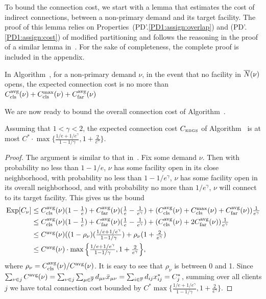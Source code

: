 
To bound the connection cost, we start with a lemma
that estimates the cost of indirect connections, between a non-primary demand and its
target facility. The proof of this lemma relies on
Properties~(PD'.\ref{PD1:assign:overlap}) and (PD'.\ref{PD1:assign:cost}) of 
modified partitioning and follows the reasoning in the proof of a similar 
lemma in~\cite{ByrkaGS10,ByrkaA10}.
For the sake of completeness, the complete proof is included in the appendix.

\begin{lemma}\label{lem: EBGS target connection cost}
In Algorithm~{\EBGS}, for a non-primary demand $\nu$, in the event that
no facility in ${\overline{N}}(\nu)$ opens, the expected connection cost is
  no more than $C_{\text{cls}}^{{\mbox{\scriptsize\rm avg}}}(\nu)+C_{\text{cls}}^{\max}(\nu)+C_{\text{far}}^{{\mbox{\scriptsize\rm avg}}}(\nu)$
\end{lemma}

We are now ready to bound the overall connection cost of Algorithm~{\EBGS}.

\begin{lemma}\label{lem: EBGS connection cost}
  Assuming that $1 < \gamma < 2$, the expected connection
  cost $C_{\mbox{\tiny\rm EBGS}}$ of Algorithm~{\EBGS} is at most
  $C^\ast\cdot\max\{\frac{1/e+1/e^\gamma}{1-1/\gamma},
  1+\frac{2}{e^\gamma}\}$.
\end{lemma}

\begin{proof}
The argument is similar to that in~\cite{ByrkaGS10}. Fix some
demand $\nu$. Then with
  probability no less than $1-1/e$, $\nu$ has some facility open in
  its close neighborhood, with probability no less than
  $1-1/e^\gamma$, $\nu$ has some facility open in its overall
  neighborhood, and with probability no more than $1/e^\gamma$, $\nu$
  will connect to its target facility.  This gives us the bound
%
\begin{align*}
  \mbox{\rm Exp}[C_{\nu}] &\leq 
	\textstyle 
	C_{\text{cls}}^{{\mbox{\scriptsize\rm avg}}}(\nu)(1-\frac{1}{e}) + C_{\text{far}}^{{\mbox{\scriptsize\rm avg}}}(\nu)(\frac{1}{e}-\frac{1}{e^\gamma}) 
					+ (C_{\text{cls}}^{{\mbox{\scriptsize\rm avg}}}(\nu)+C_{\text{cls}}^{\max}(\nu)+C_{\text{far}}^{{\mbox{\scriptsize\rm avg}}}(\nu))\frac{1}{e^\gamma}
\\
  &\leq 
	\textstyle
	C_{\text{cls}}^{{\mbox{\scriptsize\rm avg}}}(\nu)(1-\frac{1}{e}) + C_{\text{far}}^{{\mbox{\scriptsize\rm avg}}}(\nu)(\frac{1}{e}-\frac{1}{e^\gamma})
	 			+ (C_{\text{cls}}^{{\mbox{\scriptsize\rm avg}}}(\nu)+2C_{\text{far}}^{{\mbox{\scriptsize\rm avg}}}(\nu))\frac{1}{e^\gamma}
\\
  &\leq
	\textstyle
  C^{{\mbox{\scriptsize\rm avg}}}(\nu)((1-\rho_{\nu})(\frac{1/e+1/e^\gamma}{1-1/\gamma})
  + \rho_{\nu}(1+\frac{2}{e^\gamma}) 
\\
  &\leq 
	\textstyle
	C^{{\mbox{\scriptsize\rm avg}}}(\nu) \cdot \max\Big\{\frac{1/e+1/e^\gamma}{1-1/\gamma},
  								1+\frac{2}{e^\gamma}\Big\},
\end{align*}
%
where $\rho_{\nu}=C_{\text{cls}}^{{\mbox{\scriptsize\rm avg}}}(\nu)/C^{{\mbox{\scriptsize\rm avg}}}(\nu)$. It is easy
to see that $\rho_{\nu}$ is between 0 and 1.
Since $\sum_{\nu\in j} C^{{\mbox{\scriptsize\rm avg}}}(\nu) = \sum_{\nu\in
  j}\sum_{\mu\in\overline{\mathbb{F}}} d_{\mu\nu}{\bar x}_{\mu\nu} =
\sum_{i\in\mathbb{F}} d_{ij}x_{ij}^\ast = C_j^\ast$, summing
over all clients $j$ we have total connection cost bounded
by $C^\ast \max\{\frac{1/e+1/e^\gamma}{1-1/\gamma},
1+\frac{2}{e^\gamma}\}$. 
\end{proof}

